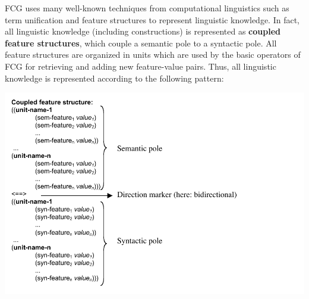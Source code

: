 FCG uses many well-known techniques from computational linguistics such as term unification and feature structures to represent linguistic knowledge. In fact, all linguistic knowledge (including constructions) is represented as {\bfseries coupled feature structures}, which couple a semantic pole to a syntactic pole. All feature structures are organized in units which are used by the basic operators of FCG for retrieving and adding new feature-value pairs. Thus, all linguistic knowledge is represented according to the following pattern:

\includegraphics[width=\linewidth]{Chapter2/figs/fcg-pattern}

